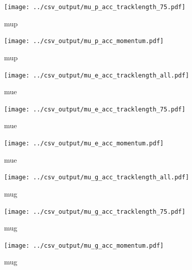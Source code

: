 \begin{figure}[htp]
\centering
\texttt{[image: ../csv\_output/mu\_p\_acc\_tracklength\_75.pdf]}
\caption{mup}
\label{fig:mu_p}
\end{figure}

\begin{figure}[htp]
\centering
\texttt{[image: ../csv\_output/mu\_p\_acc\_momentum.pdf]}
\caption{mup}
\label{fig:mu_p}
\end{figure}

\begin{figure}[htp]
\centering
\texttt{[image: ../csv\_output/mu\_e\_acc\_tracklength\_all.pdf]}
\caption{mue}
\label{fig:mu_e}
\end{figure}

\begin{figure}[htp]
\centering
\texttt{[image: ../csv\_output/mu\_e\_acc\_tracklength\_75.pdf]}
\caption{mue}
\label{fig:mu_e}
\end{figure}

\begin{figure}[htp]
\centering
\texttt{[image: ../csv\_output/mu\_e\_acc\_momentum.pdf]}
\caption{mue}
\label{fig:mu_e}
\end{figure}

\begin{figure}[htp]
\centering
\texttt{[image: ../csv\_output/mu\_g\_acc\_tracklength\_all.pdf]}
\caption{mug}
\label{fig:mu_g}
\end{figure}

\begin{figure}[htp]
\centering
\texttt{[image: ../csv\_output/mu\_g\_acc\_tracklength\_75.pdf]}
\caption{mug}
\label{fig:mu_g}
\end{figure}

\begin{figure}[htp]
\centering
\texttt{[image: ../csv\_output/mu\_g\_acc\_momentum.pdf]}
\caption{mug}
\label{fig:mu_g}
\end{figure}

